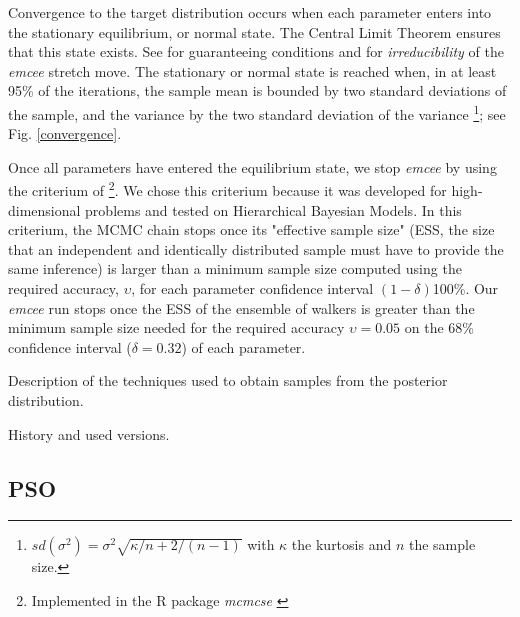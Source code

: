 Convergence to the target distribution occurs when each parameter enters into the stationary equilibrium, or normal state. The Central Limit Theorem ensures that this state exists. See \citet{Roberts2004} for guaranteeing conditions and \citet{Goodman2010} for \emph{irreducibility} of the \emph{emcee} stretch move. The stationary or normal state is reached when, in at least 95\% of the iterations, the sample mean is bounded by two standard deviations of the sample, and the variance by the two standard deviation of the variance \footnote{
$sd(\sigma^2)=\sigma^2 \sqrt{\kappa/n + 2/(n-1)}$ with $\kappa$ the kurtosis and $n$ the sample size.
}; see Fig. \ref{convergence}.
\begin{figure*}[htbp]
\begin{center}
\caption{Normalised mean (left panel) and variance (right panel) of each parameter in our model, as functions of iterations. The normalisation values are the mean and variance of the ensemble of particles positions at the last iteration. Red lines show one and two sigma levels of these normalisation values.}
\label{convergence}
\end{center}
\end{figure*}

Once all parameters have entered the equilibrium state, we stop \emph{emcee} by using the criterium of \citet{Gong2016} \footnote{Implemented in the R package \emph{mcmcse} \citep{mcmcse}}. We chose this criterium because it was developed for high-dimensional problems and tested on Hierarchical Bayesian Models. In this criterium, the MCMC chain stops once its "effective sample size" (ESS, the size that an independent and identically distributed sample must have to provide the same inference) is larger than a minimum sample size computed using the required accuracy, $\upsilon$, for each parameter confidence interval $(1-\delta)$100\%. Our \emph{emcee} run stops once the ESS of the ensemble of walkers is greater than the minimum sample size needed for the required accuracy $\upsilon = 0.05$ on the 68\% confidence interval ($\delta = 0.32$) of each parameter.


Description of the techniques used to obtain samples from the posterior distribution.

History and used versions.

\subsection{PSO}
